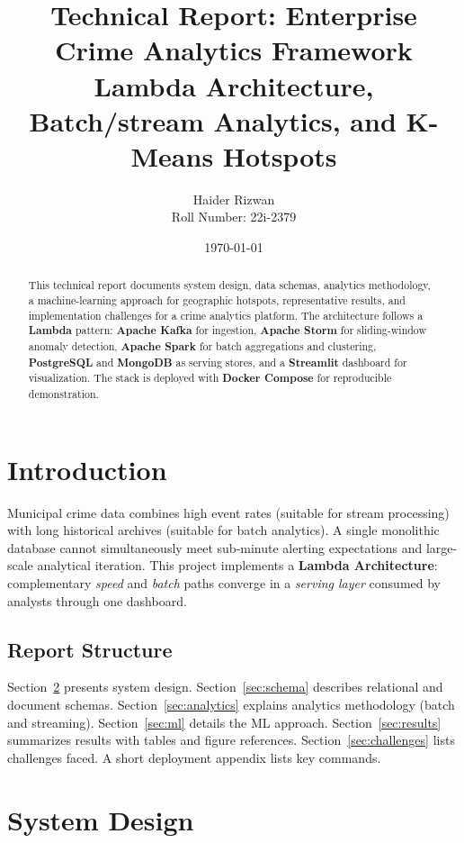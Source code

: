 \documentclass[12pt,a4paper]{article}
\title{\textbf{Technical Report: Enterprise Crime Analytics Framework}\\
\large{Lambda Architecture, Batch/stream Analytics, and K-Means Hotspots}}
\author{Haider Rizwan \\ \small{Roll Number: 22i-2379}}
\date{\today}
\begin{document}
\maketitle

\begin{abstract}
\noindent
This technical report documents system design, data schemas, analytics methodology, a machine-learning approach for geographic hotspots, representative results, and implementation challenges for a crime analytics platform. The architecture follows a \textbf{Lambda} pattern: \textbf{Apache Kafka} for ingestion, \textbf{Apache Storm} for sliding-window anomaly detection, \textbf{Apache Spark} for batch aggregations and clustering, \textbf{PostgreSQL} and \textbf{MongoDB} as serving stores, and a \textbf{Streamlit} dashboard for visualization. The stack is deployed with \textbf{Docker Compose} for reproducible demonstration.
\end{abstract}

\tableofcontents
\newpage

\section{Introduction}
Municipal crime data combines high event rates (suitable for stream processing) with long historical archives (suitable for batch analytics). A single monolithic database cannot simultaneously meet sub-minute alerting expectations and large-scale analytical iteration. This project implements a \textbf{Lambda Architecture}: complementary \emph{speed} and \emph{batch} paths converge in a \emph{serving layer} consumed by analysts through one dashboard.

\subsection{Report Structure}
Section~\ref{sec:design} presents system design. Section~\ref{sec:schema} describes relational and document schemas. Section~\ref{sec:analytics} explains analytics methodology (batch and streaming). Section~\ref{sec:ml} details the ML approach. Section~\ref{sec:results} summarizes results with tables and figure references. Section~\ref{sec:challenges} lists challenges faced. A short deployment appendix lists key commands.

\section{System Design}
\label{sec:design}
\end{document}
